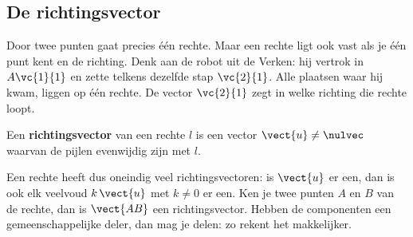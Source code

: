 \subsection{De richtingsvector}

Door twee punten gaat precies één rechte. Maar een rechte ligt ook vast als je één punt kent en de richting. Denk aan de robot uit de Verken: hij vertrok in $A\vc{1}{1}$ en zette telkens dezelfde stap $\vc{2}{1}$. Alle plaatsen waar hij kwam, liggen op één rechte. De vector $\vc{2}{1}$ zegt in welke richting die rechte loopt.


\begin{theorie}
Een \textbf{\textcolor{accent}{richtingsvector}} van een rechte $l$ is een vector $\vect{u} \neq \nulvec$ waarvan de pijlen evenwijdig zijn met $l$.
\end{theorie}

Een rechte heeft dus oneindig veel richtingsvectoren: is $\vect{u}$ er een, dan is ook elk veelvoud $k\,\vect{u}$ met $k \neq 0$ er een. Ken je twee punten $A$ en $B$ van de rechte, dan is $\vect{AB}$ een richtingsvector. Hebben de componenten een gemeenschappelijke deler, dan mag je delen: zo rekent het makkelijker.

